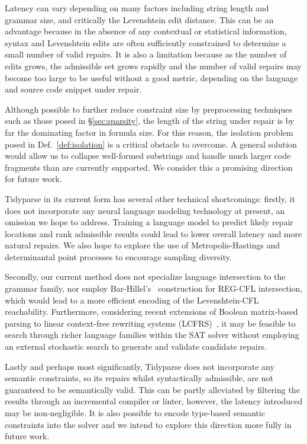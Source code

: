 \documentclass[sigplan,review,anonymous,acmsmall]{acmart}\settopmatter{printfolios=false,printccs=false,printacmref=false}
\begin{document}
Latency can vary depending on many factors including string length and grammar size, and critically the Levenshtein edit distance. This can be an advantage because in the absence of any contextual or statistical information, syntax and Levenshtein edits are often sufficiently constrained to determine a small number of valid repairs. It is also a limitation because as the number of edits grows, the admissible set grows rapidly and the number of valid repairs may become too large to be useful without a good metric, depending on the language and source code snippet under repair.

Although possible to further reduce constraint size by preprocessing techniques such as those posed in \S\ref{sec:sparsity}, the length of the string under repair is by far the dominating factor in formula size. For this reason, the isolation problem posed in Def.~\ref{def:isolation} is a critical obstacle to overcome. A general solution would allow us to collapse well-formed substrings and handle much larger code fragments than are currently supported. We consider this a promising direction for future work.

Tidyparse in its current form has several other technical shortcomings: firstly, it does not incorporate any neural language modeling technology at present, an omission we hope to address. Training a language model to predict likely repair locations and rank admissible results could lead to lower overall latency and more natural repairs. We also hope to explore the use of Metropolis-Hastings and determinantal point processes to encourage sampling diversity.

Secondly, our current method does not specialize language intersection to the grammar family, nor employ Bar-Hillel's~\cite{bar1961formal} construction for REG-CFL intersection, which would lead to a more efficient encoding of the Levenshtein-CFL reachability. Furthermore, considering recent extensions of Boolean matrix-based parsing to linear context-free rewriting systems (LCFRS)~\cite{cohen2016parsing}, it may be feasible to search through richer language families within the SAT solver without employing an external stochastic search to generate and validate candidate repairs.

Lastly and perhaps most significantly, Tidyparse does not incorporate any semantic constraints, so its repairs whilst syntactically admissible, are not guaranteed to be semantically valid. This can be partly alleviated by filtering the results through an incremental compiler or linter, however, the latency introduced may be non-negligible. It is also possible to encode type-based semantic constraints into the solver and we intend to explore this direction more fully in future work.
\end{document}
